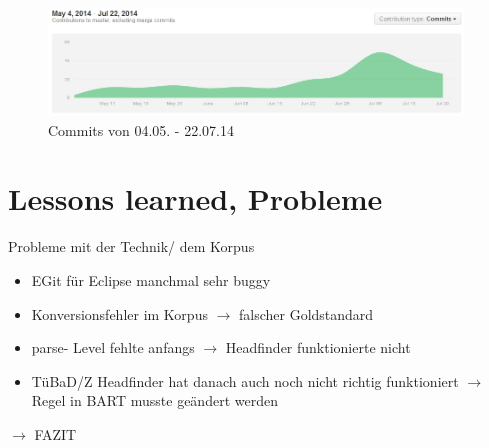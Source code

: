\documentclass[11pt,a4paper]{beamer}
\begin{document}
\begin{frame}

    \begin{gantt}{10}{9}
    \begin{ganttitle}
    \end{ganttitle}
    \begin{ganttitle}
    \end{ganttitle}
  \end{gantt}
  
\end{frame}

\begin{frame}
\begin{figure}
\begin{center}
\includegraphics[width=11cm]{contributions_to_master.jpg}
\caption{Commits von 04.05. - 22.07.14}
\label{fig:contributions}
\end{center}
\end{figure}
\end{frame}


\section{Lessons learned, Probleme}
\begin{frame}{Probleme mit der Technik/ dem Korpus}
\begin{itemize}
\item EGit für Eclipse manchmal sehr buggy
\item Konversionsfehler im Korpus $\rightarrow$ falscher Goldstandard
\item parse- Level fehlte anfangs $\rightarrow$ Headfinder funktionierte nicht
\item TüBaD/Z Headfinder hat danach auch noch nicht richtig funktioniert $\rightarrow$ Regel in BART musste geändert werden
\end{itemize}
$\rightarrow$  FAZIT

\end{frame}
\end{document}
